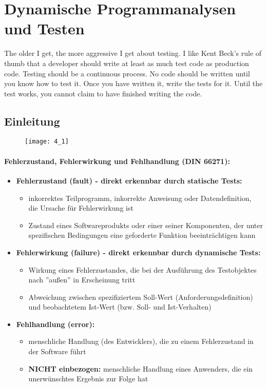 \section{Dynamische Programmanalysen und Testen}
The older I get, the more aggressive I get about testing. I like Kent Beck’s rule of thumb that a developer should write at least as much test code as production code. Testing should be a continuous process. No code should be written until you know how to test it. Once you have written it, write the tests for it. Until the test works, you cannot claim to have finished writing the code.

\subsection{Einleitung}

\begin{figure}[h]
	\centering
	\texttt{[image: 4\_1]}
\end{figure}

\paragraph{Fehlerzustand, Fehlerwirkung und Fehlhandlung (DIN 66271):}

\begin{itemize}
	\item \textbf{Fehlerzustand (fault) - direkt erkennbar durch statische Tests: }
	\begin{itemize}
		\item inkorrektes Teilprogramm, inkorrekte Anweisung oder Datendefinition, die Ursache für Fehlerwirkung ist
		\item Zustand eines Softwareprodukts oder einer seiner Komponenten, der unter spezifischen Bedingungen eine geforderte Funktion beeinträchtigen kann
	\end{itemize}
	\item \textbf{Fehlerwirkung (failure) - direkt erkennbar durch dynamische Tests: }
	\begin{itemize}
		\item Wirkung eines Fehlerzustandes, die bei der Ausführung des Testobjektes nach ''außen'' in Erscheinung tritt
		\item Abweichung zwischen spezifiziertem Soll-Wert (Anforderungsdefinition) und beobachtetem Ist-Wert (bzw. Soll- und Ist-Verhalten)
	\end{itemize}
	\item \textbf{Fehlhandlung (error): }
	\begin{itemize}
		\item menschliche Handlung (des Entwicklers), die zu einem Fehlerzustand in der Software führt
		\item \textbf{NICHT einbezogen:} menschliche Handlung eines Anwenders, die ein unerwünschtes Ergebnis zur Folge hat
	\end{itemize}
\end{itemize}

